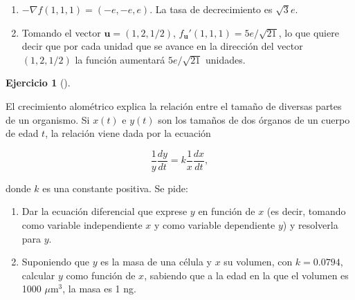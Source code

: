 \documentclass[
  a4paper,
]{scrreport}
\providecommand{\tightlist}{%
  \setlength{\itemsep}{0pt}\setlength{\parskip}{0pt}}\usepackage{longtable,booktabs,array}
\theoremstyle{definition}
\newtheorem{exercise}{Ejercicio}[chapter]
\theoremstyle{remark}
\begin{document}
\begin{tcolorbox}[enhanced jigsaw, opacitybacktitle=0.6, titlerule=0mm, bottomtitle=1mm, toptitle=1mm, breakable, bottomrule=.15mm, left=2mm, opacityback=0, toprule=.15mm, leftrule=.75mm, colframe=quarto-callout-tip-color-frame, coltitle=black, rightrule=.15mm, colback=white, title=\textcolor{quarto-callout-tip-color}{\faLightbulb}\hspace{0.5em}{Solución}, arc=.35mm, colbacktitle=quarto-callout-tip-color!10!white]

\begin{enumerate}
\def\labelenumi{\arabic{enumi}.}
\tightlist
\item
  \(-\nabla f(1,1,1)=(-e,-e,e)\). La tasa de decrecimiento es
  \(\sqrt{3}e\).
\item
  Tomando el vector \(\mathbf{u}=(1,2,1/2)\),
  \(f_{\mathbf{u}}'(1,1,1)=5e/\sqrt{21}\), lo que quiere decir que por
  cada unidad que se avance en la dirección del vector \((1,2,1/2)\) la
  función aumentará \(5e/\sqrt{21}\) unidades.
\end{enumerate}

\end{tcolorbox}

\begin{exercise}[]\protect\hypertarget{exr-3}{}\label{exr-3}

El crecimiento alométrico explica la relación entre el tamaño de
diversas partes de un organismo. Si \(x(t)\) e \(y(t)\) son los tamaños
de dos órganos de un cuerpo de edad \(t\), la relación viene dada por la
ecuación

\[
\frac{1}{y}\frac{dy}{dt} = k \frac{1}{x}\frac{dx}{dt},
\]

donde \(k\) es una constante positiva. Se pide:

\begin{enumerate}
\def\labelenumi{\arabic{enumi}.}
\item
  Dar la ecuación diferencial que exprese \(y\) en función de \(x\) (es
  decir, tomando como variable independiente \(x\) y como variable
  dependiente \(y\)) y resolverla para \(y\).
\item
  Suponiendo que \(y\) es la masa de una célula y \(x\) su volumen, con
  \(k=0.0794\), calcular \(y\) como función de \(x\), sabiendo que a la
  edad en la que el volumen es 1000 \(\mu\)m\(^3\), la masa es 1 ng.
\end{enumerate}

\end{exercise}
\end{document}
